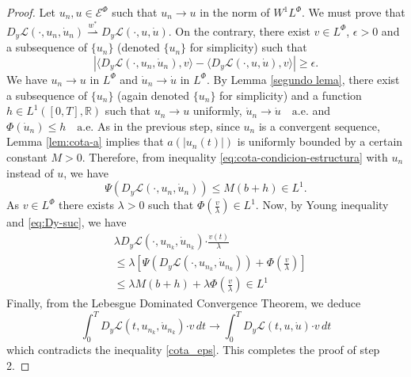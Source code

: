 \documentclass[twoside]{article}
\theoremstyle{remark}
\newcommand{\lphi}{L^{\Phi}}
\newcommand{\wphi}{W^{1}\lphi}
\newcommand{\domi}{\mathcal{E}^{\Phi}}
\renewcommand{\b}[1]{\boldsymbol{#1}}
\newcommand{\rr}{\mathbb{R}}
\newcommand{\ccdot}{\b{\cdot}}
\renewcommand{\leq}{\leqslant}
\renewcommand{\geq}{\geqslant}
\begin{document}
\begin{proof}
Let $u_n,u\in \domi$ such that $u_n\to u$ in the norm of $\wphi$. 
We must prove that  $D_{y}\mathcal{L}(\cdot,u_n,\dot{u}_n)\overset{w^*}{\rightharpoonup} 
D_{y}\mathcal{L}(\cdot,u,\dot{u})$. 
On the contrary, there exist $v\in\lphi$, $\epsilon>0$ and a subsequence of $\{u_n\}$ (denoted  $\{u_n\}$ for simplicity)  such that
\begin{equation}\label{cota_eps}
 \left| \langle D_{y}\mathcal{L}(\cdot,u_n,\dot{u}_n),v \rangle - 
\langle  D_{y}\mathcal{L}(\cdot,u,\dot{u}),v \rangle\right|\geq \epsilon.
\end{equation}
We have $u_n\rightarrow u$ in $\lphi$ and
$\dot{u}_n\rightarrow \dot{u}$ in $\lphi$.
 By Lemma \ref{segundo lema}, there exist a subsequence of $\{u_n\}$ (again denoted  $\{u_n\}$ for simplicity) 
and a function $h\in L^1([0,T],\rr)$ such that 
$u_n\rightarrow u$ uniformly, $\dot{u}_n\rightarrow \dot{u} \quad\text{a.e.}$ and $\Phi(\dot{u}_n)\leq h\quad\text{a.e.}$ 
As in the previous step, since $u_n$ is a convergent sequence, 
Lemma \ref{lem:cota-a} implies that $a(|u_n(t)|)$ is uniformly bounded by a certain constant $M>0$. 
Therefore,   from inequality  \eqref{eq:cota-condicion-estructura} with $u_n$ instead of $u$, we have 
\begin{equation}\label{eq:Dy-suc}
  \Psi(D_{y}\mathcal{L}(\cdot,u_n,\dot{u}_n))   
	\leq M (b+h)\in L^1.
\end{equation}
As $v \in \lphi$ there exists $\lambda>0$ such that $\Phi(\frac{v}{\lambda})\in L^1$. 
Now, by Young inequality and \eqref{eq:Dy-suc}, we have
\begin{equation}\label{eq:Dy_lambda-Psi}
\begin{split}
&\lambda D_{y}\mathcal{L}(\cdot,u_{n_k},\dot{u}_{n_k})\ccdot \frac{v(t)}{\lambda} 
\\
&
\leq 
\lambda\left[\Psi(D_{y}\mathcal{L}(\cdot,u_{n_k},\dot{u}_{n_k}))+\Phi\left(\frac{v}{\lambda}\right)\right]
\\
&\leq \lambda M (b+h)+\lambda \Phi\left(\frac{v}{\lambda}\right)\in L^1
\end{split}
\end{equation}
  Finally, from the Lebesgue Dominated Convergence Theorem, we deduce
\begin{equation}\label{conv_debil}
\int_0^T  D_{y}\mathcal{L}(t,u_{n_k},\dot{u}_{n_k})
\ccdot  v \,dt 
\to 
\int_0^T D_{y}\mathcal{L}(t,u,\dot{u})\ccdot v\, dt \end{equation}
which contradicts the inequality \eqref{cota_eps}. This completes the proof of step 2.


\end{proof}
\end{document}

